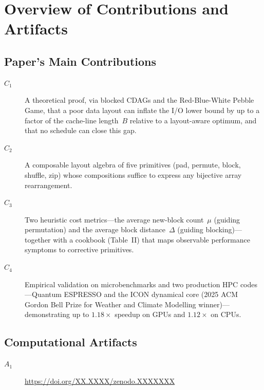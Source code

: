 \documentclass[conference]{IEEEtran}
\begin{document}


\appendixAD

\section{Overview of Contributions and Artifacts}

\subsection{Paper's Main Contributions}

\begin{description}
\item[$C_1$] A theoretical proof, via blocked CDAGs and the Red-Blue-White Pebble Game, that a poor data layout can inflate the I/O lower bound by up to a factor of the cache-line length~$B$ relative to a layout-aware optimum, and that no schedule can close this gap.
\item[$C_2$] A composable layout algebra of five primitives (pad, permute, block, shuffle, zip) whose compositions suffice to express any bijective array rearrangement.
\item[$C_3$] Two heuristic cost metrics---the average new-block count~$\mu$ (guiding permutation) and the average block distance~$\Delta$ (guiding blocking)---together with a cookbook (Table~II) that maps observable performance symptoms to corrective primitives.
\item[$C_4$] Empirical validation on microbenchmarks and two production HPC codes---Quantum ESPRESSO and the ICON dynamical core (2025 ACM Gordon Bell Prize for Weather and Climate Modelling winner)---demonstrating up to $1.18\times$ speedup on GPUs and $1.12\times$ on CPUs.
\end{description}

\subsection{Computational Artifacts}

\begin{description}
\item[$A_1$] \url{https://doi.org/XX.XXXX/zenodo.XXXXXXX}
\end{description}
\end{document}
